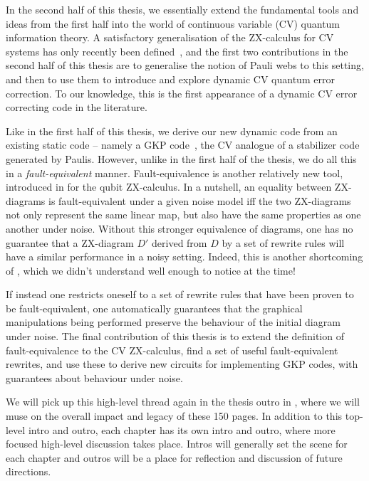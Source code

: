 In the second half of this thesis, we essentially extend the fundamental tools and ideas from the first half into the world of continuous variable (CV) quantum information theory.
A satisfactory generalisation of the ZX-calculus for CV systems has only recently been defined~\cite{shaikh2024fockedupzxcalculuspicturing}, and the first two contributions in the second half of this thesis are to generalise the notion of Pauli webs to this setting, and then to use them to introduce and explore dynamic CV quantum error correction.
To our knowledge, this is the first appearance of a dynamic CV error correcting code in the literature.

Like in the first half of this thesis, we derive our new dynamic code from an existing static code -- namely a GKP code~\cite{Gottesman_2001}, the CV analogue of a stabilizer code generated by Paulis.
However, unlike in the first half of the thesis, we do all this in a \textit{fault-equivalent} manner.
Fault-equivalence is another relatively new tool, introduced in  for the qubit ZX-calculus.
In a nutshell, an equality between ZX-diagrams is fault-equivalent under a given noise model iff the two ZX-diagrams not only represent the same linear map, but also have the same properties as one another under noise.
Without this stronger equivalence of diagrams, one has no guarantee that a ZX-diagram $D'$ derived from $D$ by a set of rewrite rules will have a similar performance in a noisy setting.
Indeed, this is another shortcoming of , which we didn't understand well enough to notice at the time!

If instead one restricts oneself to a set of rewrite rules that have been proven to be fault-equivalent, one automatically guarantees that the graphical manipulations being performed preserve the behaviour of the initial diagram under noise.
The final contribution of this thesis is to extend the definition of fault-equivalence to the CV ZX-calculus, find a set of useful fault-equivalent rewrites, and use these to derive new circuits for implementing GKP codes, with guarantees about behaviour under noise.

We will pick up this high-level thread again in the thesis outro in , where we will muse on the overall impact and legacy of these 150 pages.
In addition to this top-level intro and outro, each chapter has its own intro and outro, where more focused high-level discussion takes place.
Intros will generally set the scene for each chapter and outros will be a place for reflection and discussion of future directions.
